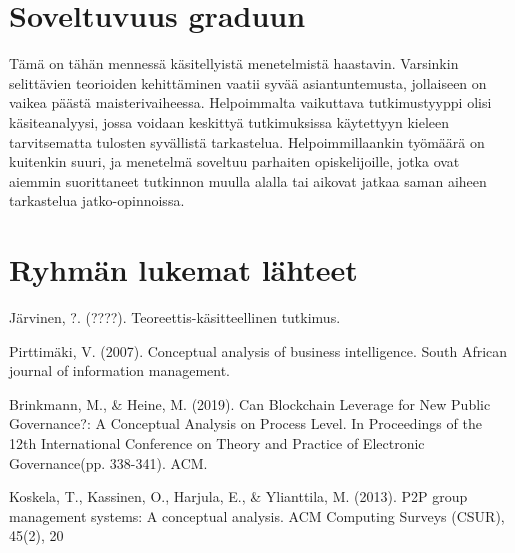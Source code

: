 \documentclass{article}
\begin{document}
\section*{Soveltuvuus graduun}

Tämä on tähän mennessä käsitellyistä menetelmistä haastavin. Varsinkin
selittävien teorioiden kehittäminen vaatii syvää asiantuntemusta, jollaiseen on
vaikea päästä maisterivaiheessa. Helpoimmalta vaikuttava tutkimustyyppi olisi
käsiteanalyysi, jossa voidaan keskittyä tutkimuksissa käytettyyn kieleen
tarvitsematta tulosten syvällistä tarkastelua. Helpoimmillaankin työmäärä on
kuitenkin suuri, ja menetelmä soveltuu parhaiten opiskelijoille, jotka ovat
aiemmin suorittaneet tutkinnon muulla alalla tai aikovat jatkaa saman aiheen
tarkastelua jatko-opinnoissa.

\section*{Ryhmän lukemat lähteet}

Järvinen, ?. (????). Teoreettis-käsitteellinen tutkimus.

Pirttimäki, V. (2007). Conceptual analysis of business intelligence.
South African journal of information management.

Brinkmann, M., \& Heine, M. (2019).
Can Blockchain Leverage for New Public Governance?:
A Con\-ceptual Analysis on Process Level.
In Proceedings of the 12th International Conference on
Theory and Practice of Electronic Governance(pp. 338-341). ACM.

Koskela, T., Kassinen, O., Harjula, E., \& Ylianttila, M. (2013).
P2P group management systems: A conceptual analysis.
ACM Computing Surveys (CSUR), 45(2), 20
\end{document}
